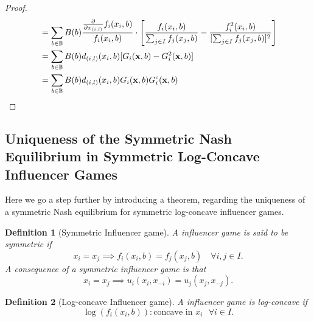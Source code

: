 \documentclass{article}
\newtheorem{definition}{Definition}
\newcommand {\B}{\mathbb{B}}
\begin{document}
\begin{proof}
\begin{align}
                    &=\sum_{b\in \B} B(b) \frac{\pdv{}{x_{(i,l)}}f_{i}(x_i,b)}{f_{i}(x_i,b)} \cdot \left[\frac{f_{i}(x_i,b)}{\sum_{j\in I} f_{j}(x_j,b)}- \frac{f_{i}^2(x_i,b)}{[\sum_{j\in I} f_{j}(x_j,b)]^2}\right] \\ %
                    &=\sum_{b\in \B} B(b) d_{(i,l)}(x_i,b) [G_i(\mathbf{x},b)- G_i^2(\mathbf{x},b)] \\ %
                    &=\sum_{b\in \B} B(b) d_{(i,l)}(x_i,b) G_i(\mathbf{x},b)G_i^c(\mathbf{x},b) \\ %
                \end{align}
            \end{proof}
            
        \subsection{Uniqueness of the Symmetric Nash Equilibrium in Symmetric Log-Concave Influencer Games}
            Here we go a step further by introducing a theorem, regarding the uniqueness of a symmetric Nash equilibrium for symmetric log-concave influencer games. 
            \begin{definition}[Symmetric Influencer game]\label{def:SI_symmetric_influencers}
                A influencer game is said to be symmetric if 
                \begin{equation}
                    x_i=x_j \implies f_i(x_i,b)=f_j(x_j,b) \quad\forall i,j\in I.
                \end{equation}
                A consequence of a symmetric influencer game is that 
                \begin{equation}\label{eq:SI_symmetric_payoff}
                    x_i=x_j \implies u_i(x_i,x_{-i})=u_{j}(x_j,x_{-j}).
                \end{equation}
            \end{definition}
            \begin{definition}[Log-concave Influencer game]\label{def:SI_log-concave_influencers}
                A influencer game is log-concave if 
                \begin{equation}
                    \log(f_i(x_i,b)): \text{concave in $x_i$ }\forall i\in I.
                \end{equation}
            \end{definition}
            
\end{document}
